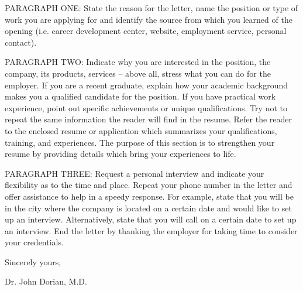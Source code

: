 \documentclass[
	12pt, %
]{letter}
\begin{document}

PARAGRAPH ONE: State the reason for the letter, name the position or type of work you are applying for and identify the source from which you learned of the opening (i.e. career development center, website, employment service, personal contact).

PARAGRAPH TWO: Indicate why you are interested in the position, the company, its products, services -- above all, stress what you can do for the employer. If you are a recent graduate, explain how your academic background makes you a qualified candidate for the position. If you have practical work experience, point out specific achievements or unique qualifications. Try not to repeat the same information the reader will find in the resume. Refer the reader to the enclosed resume or application which summarizes your qualifications, training, and experiences. The purpose of this section is to strengthen your resume by providing details which bring your experiences to life.

PARAGRAPH THREE: Request a personal interview and indicate your flexibility as to the time and place. Repeat your phone number in the letter and offer assistance to help in a speedy response. For example, state that you will be in the city where the company is located on a certain date and would like to set up an interview. Alternatively, state that you will call on a certain date to set up an interview. End the letter by thanking the employer for taking time to consider your credentials.

\smallskip %

Sincerely yours,

\bigskip\bigskip\bigskip %

Dr. John Dorian, M.D.

\end{document}
